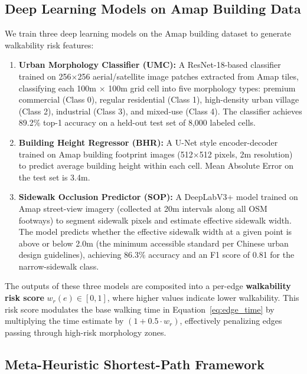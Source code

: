 \documentclass[journal]{IEEEtran}
\begin{document}
\subsection{Deep Learning Models on Amap Building Data}

We train three deep learning models on the Amap building dataset to generate walkability risk features:

\begin{enumerate}
    \item \textbf{Urban Morphology Classifier (UMC):} A ResNet-18-based classifier trained on 256$\times$256 aerial/satellite image patches extracted from Amap tiles, classifying each 100m $\times$ 100m grid cell into five morphology types: premium commercial (Class 0), regular residential (Class 1), high-density urban village (Class 2), industrial (Class 3), and mixed-use (Class 4). The classifier achieves 89.2\% top-1 accuracy on a held-out test set of 8,000 labeled cells.

    \item \textbf{Building Height Regressor (BHR):} A U-Net style encoder-decoder trained on Amap building footprint images (512$\times$512 pixels, 2m resolution) to predict average building height within each cell. Mean Absolute Error on the test set is 3.4m.

    \item \textbf{Sidewalk Occlusion Predictor (SOP):} A DeepLabV3+ model trained on Amap street-view imagery (collected at 20m intervals along all OSM footways) to segment sidewalk pixels and estimate effective sidewalk width. The model predicts whether the effective sidewalk width at a given point is above or below 2.0m (the minimum accessible standard per Chinese urban design guidelines), achieving 86.3\% accuracy and an F1 score of 0.81 for the narrow-sidewalk class.
\end{enumerate}

The outputs of these three models are composited into a per-edge \textbf{walkability risk score} $w_r(e) \in [0, 1]$, where higher values indicate lower walkability. This risk score modulates the base walking time in Equation~\ref{eq:edge_time} by multiplying the time estimate by $(1 + 0.5 \cdot w_r)$, effectively penalizing edges passing through high-risk morphology zones.

\subsection{Meta-Heuristic Shortest-Path Framework}
\label{sec:mh_framework}
\end{document}
